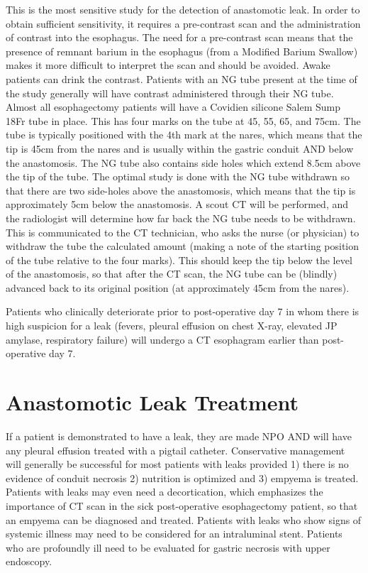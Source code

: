 \documentclass[
  letterpaper,
]{scrbook}
\begin{document}
This is the most sensitive study for the detection of anastomotic leak.
In order to obtain sufficient sensitivity, it requires a pre-contrast
scan and the administration of contrast into the esophagus. The need for
a pre-contrast scan means that the presence of remnant barium in the
esophagus (from a Modified Barium Swallow) makes it more difficult to
interpret the scan and should be avoided. Awake patients can drink the
contrast. Patients with an NG tube present at the time of the study
generally will have contrast administered through their NG tube. Almost
all esophagectomy patients will have a Covidien silicone Salem Sump 18Fr
tube in place. This has four marks on the tube at 45, 55, 65, and 75cm.
The tube is typically positioned with the 4th mark at the nares, which
means that the tip is 45cm from the nares and is usually within the
gastric conduit AND below the anastomosis. The NG tube also contains
side holes which extend 8.5cm above the tip of the tube. The optimal
study is done with the NG tube withdrawn so that there are two
side-holes above the anastomosis, which means that the tip is
approximately 5cm below the anastomosis. A scout CT will be performed,
and the radiologist will determine how far back the NG tube needs to be
withdrawn. This is communicated to the CT technician, who asks the nurse
(or physician) to withdraw the tube the calculated amount (making a note
of the starting position of the tube relative to the four marks). This
should keep the tip below the level of the anastomosis, so that after
the CT scan, the NG tube can be (blindly) advanced back to its original
position (at approximately 45cm from the nares).

Patients who clinically deteriorate prior to post-operative day 7 in
whom there is high suspicion for a leak (fevers, pleural effusion on
chest X-ray, elevated JP amylase, respiratory failure) will undergo a CT
esophagram earlier than post-operative day 7.

\section{Anastomotic Leak Treatment}\label{anastomotic-leak-treatment}

If a patient is demonstrated to have a leak, they are made NPO AND will
have any pleural effusion treated with a pigtail catheter. Conservative
management will generally be successful for most patients with leaks
provided 1) there is no evidence of conduit necrosis 2) nutrition is
optimized and 3) empyema is treated. Patients with leaks may even need a
decortication, which emphasizes the importance of CT scan in the sick
post-operative esophagectomy patient, so that an empyema can be
diagnosed and treated. Patients with leaks who show signs of systemic
illness may need to be considered for an intraluminal stent. Patients
who are profoundly ill need to be evaluated for gastric necrosis with
upper endoscopy.
\end{document}

